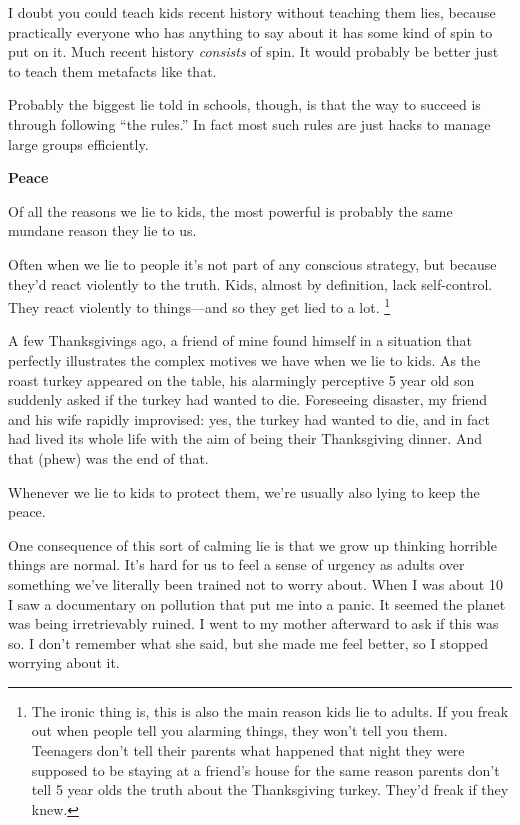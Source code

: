 I doubt you could teach kids recent history without teaching them lies,
because practically everyone who has anything to say about it has some
kind of spin to put on it. Much recent history \emph{consists} of spin.
It would probably be better just to teach them metafacts like that.

Probably the biggest lie told in schools, though, is that the way to
succeed is through following ``the rules.'' In fact most such rules are
just hacks to manage large groups efficiently.

\textbf{Peace}

Of all the reasons we lie to kids, the most powerful is probably the
same mundane reason they lie to us.

Often when we lie to people it's not part of any conscious strategy, but
because they'd react violently to the truth. Kids, almost by definition,
lack self-control. They react violently to things---and so they get lied
to a lot. \footnote{The ironic thing is, this is also the main reason kids lie to
adults. If you freak out when people tell you alarming things, they
won't tell you them. Teenagers don't tell their parents what happened
that night they were supposed to be staying at a friend's house for the
same reason parents don't tell 5 year olds the truth about the
Thanksgiving turkey. They'd freak if they knew.}

A few Thanksgivings ago, a friend of mine found himself in a situation
that perfectly illustrates the complex motives we have when we lie to
kids. As the roast turkey appeared on the table, his alarmingly
perceptive 5 year old son suddenly asked if the turkey had wanted to
die. Foreseeing disaster, my friend and his wife rapidly improvised:
yes, the turkey had wanted to die, and in fact had lived its whole life
with the aim of being their Thanksgiving dinner. And that (phew) was the
end of that.

Whenever we lie to kids to protect them, we're usually also lying to
keep the peace.

One consequence of this sort of calming lie is that we grow up thinking
horrible things are normal. It's hard for us to feel a sense of urgency
as adults over something we've literally been trained not to worry
about. When I was about 10 I saw a documentary on pollution that put me
into a panic. It seemed the planet was being irretrievably ruined. I
went to my mother afterward to ask if this was so. I don't remember what
she said, but she made me feel better, so I stopped worrying about it.

